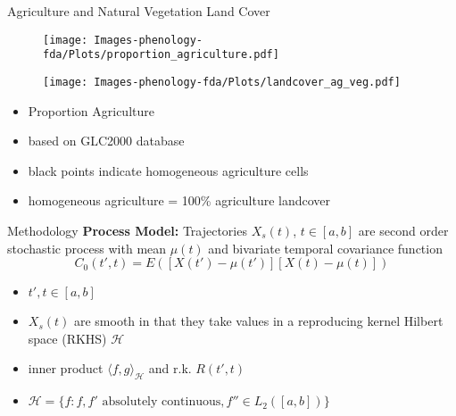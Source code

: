 \documentclass{beamer}
\renewcommand{\H}{\mathcal{H}}
\newcommand{\inner}[2]{\langle #1, #2 \rangle}
\begin{document}
\begin{frame}[t]{Agriculture and Natural Vegetation Land Cover}
	\begin{minipage}{0.48\textwidth}
		\begin{figure}
		\texttt{[image: Images-phenology-fda/Plots/proportion\_agriculture.pdf]}
		\end{figure}
	\end{minipage}
	\begin{minipage}{0.48\textwidth}
		\begin{figure}
		\texttt{[image: Images-phenology-fda/Plots/landcover\_ag\_veg.pdf]}
		\end{figure}
	\end{minipage}

	\begin{minipage}{0.48\textwidth}
	\begin{itemize}
		\item Proportion Agriculture
		\item based on GLC2000 database
	\end{itemize}
	\end{minipage}
	\begin{minipage}{0.48\textwidth}
	\begin{itemize}
		\item black points indicate homogeneous agriculture cells
		\item homogeneous agriculture = 100\% agriculture landcover
	\end{itemize}
	\end{minipage}
\end{frame}


\begin{frame}[t]{Methodology}
	\textbf{Process Model:}
	 Trajectories $X_s(t)$, $t \in [a,b]$ are second order stochastic process with mean $\mu(t)$ and bivariate temporal covariance function
	\begin{equation*}
		C_{0}(t',t)=E([X(t')-\mu(t')][X(t)-\mu(t)])
	\end{equation*}
	\begin{itemize}
		\item $t',t\in [a,b]$
		\item $X_s(t)$ are smooth in that they take values in a reproducing kernel Hilbert space (RKHS) $\H$
		\item inner product $\inner{f}{g}_{\H}$ and r.k. $R(t',t)$
		\item $\H= \{f : f, f' \mbox{ absolutely continuous}, f'' \in L_2([a,b])\}$
	\end{itemize}

\end{frame}
\end{document}
